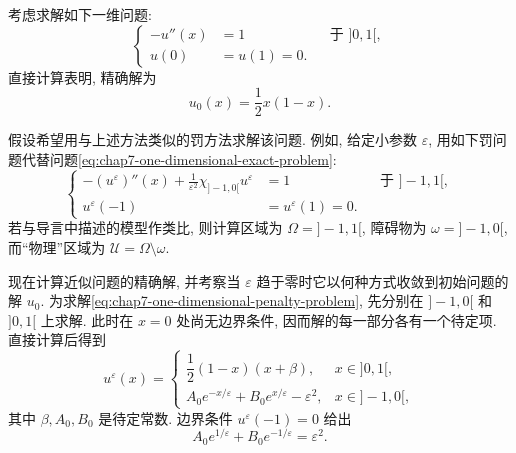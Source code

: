 \begin{sloppypar}
考虑求解如下一维问题:
\begin{equation}
\left\{
\begin{aligned}
 -u''(x)&=1&&\text{于 } ]0,1[,\\
 u(0)&=u(1)=0.
\end{aligned}
\right.
\label{eq:chap7-one-dimensional-exact-problem}
\end{equation}
直接计算表明, 精确解为
\[
 u_0(x)=\frac12x(1-x).
\]

假设希望用与上述方法类似的罚方法求解该问题. 例如, 给定小参数 $\varepsilon$, 用如下罚问题代替问题\eqref{eq:chap7-one-dimensional-exact-problem}:
\begin{equation}
\left\{
\begin{aligned}
 -(u^\varepsilon)''(x)+\frac1{\varepsilon^2}\chi_{]-1,0[}u^\varepsilon&=1
 &&\text{于 } ]-1,1[,\\
 u^\varepsilon(-1)&=u^\varepsilon(1)=0.
\end{aligned}
\right.
\label{eq:chap7-one-dimensional-penalty-problem}
\end{equation}
若与导言中描述的模型作类比, 则计算区域为 $\Omega=]-1,1[$, 障碍物为 $\omega=]-1,0[$, 而``物理''区域为 $\mathcal U=\Omega\setminus\omega$.

现在计算近似问题的精确解, 并考察当 $\varepsilon$ 趋于零时它以何种方式收敛到初始问题的解 $u_0$. 为求解\eqref{eq:chap7-one-dimensional-penalty-problem}, 先分别在 $]-1,0[$ 和 $]0,1[$ 上求解. 此时在 $x=0$ 处尚无边界条件, 因而解的每一部分各有一个待定项. 直接计算后得到
\[
 u^\varepsilon(x)=
 \begin{cases}
  \dfrac12(1-x)(x+\beta),&x\in]0,1[,\\[4pt]
  A_0e^{-x/\varepsilon}+B_0e^{x/\varepsilon}-\varepsilon^2,&x\in]-1,0[,
 \end{cases}
\]
其中 $\beta,A_0,B_0$ 是待定常数. 边界条件 $u^\varepsilon(-1)=0$ 给出
\begin{equation}
 A_0e^{1/\varepsilon}+B_0e^{-1/\varepsilon}=\varepsilon^2.
\label{eq:chap7-one-dimensional-coefficient-one}
\end{equation}


\end{sloppypar}
